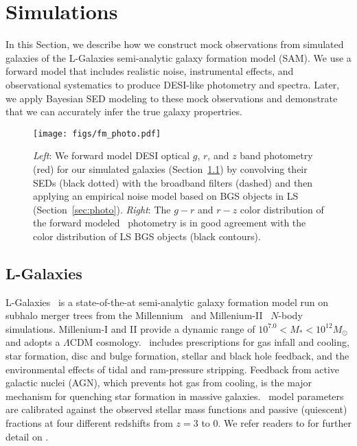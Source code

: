 \section{Simulations}\label{sec:sims}
In this Section, we describe how we construct mock observations from simulated
galaxies of the {\sc L-Galaxies} semi-analytic galaxy formation model (SAM).
We use a forward model that includes realistic noise, instrumental effects, and
observational systematics to produce DESI-like photometry and spectra. 
Later, we apply Bayesian SED modeling to these mock observations and
demonstrate that we can accurately infer the true galaxy propertries.

\begin{figure}
\begin{center}
\texttt{[image: figs/fm\_photo.pdf]}
\caption{{\em Left}: We forward model DESI optical $g$, $r$, and $z$ band
    photometry (red) for our simulated galaxies (Section~\ref{sec:lgal}) by
    convolving their SEDs (black dotted) with the broadband filters (dashed)
    and then applying an empirical noise model based on BGS objects in LS
    (Section~\ref{sec:photo}).
    {\em Right}: The $g-r$ and $r-z$ color distribution of the forward modeled
    \lgal~photometry is in good agreement with the color distribution of LS BGS
    objects (black contours). 
    } \label{fig:photo}
\end{center}
\end{figure}

\subsection{L-Galaxies} \label{sec:lgal}
{\sc L-Galaxies}~\citep[hereafter \lgal;][]{henriques2015} is a state-of-the-at
semi-analytic galaxy formation model run on subhalo merger trees from the
Millennium~\citep{springel2005a} and Millenium-II~\citep{boylan-kolchin2009}
$N$-body simulations. 
Millenium-I and II provide a dynamic range of $10^{7.0} < M_* < 10^{12}
M_\odot$ and adopts a \cite{planckcollaboration2014a} $\Lambda$CDM cosmology.
\lgal~includes prescriptions for gas infall and cooling, star formation, disc
and bulge formation, stellar and black hole feedback, and the environmental
effects of tidal and ram-pressure stripping.
Feedback from active galactic nuclei (AGN), which prevents hot gas from
cooling, is the major mechanism for quenching star formation in massive
galaxies.
\lgal~model parameters are calibrated against the observed stellar mass
functions and passive (quiescent) fractions at four different redshifts from 
$z = 3$ to 0.
We refer readers to \cite{henriques2015} for further detail on \lgal.

